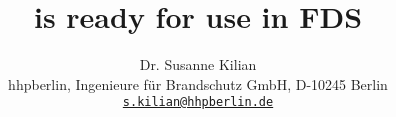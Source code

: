 \documentclass[12pt]{article}
\def\bibPath{../../../fds/Manuals/Bibliography}
\def\scarcPath{../ScaRC_Guide}
\begin{document}
\title{\scarc{} is ready for use in FDS}
\author{Dr. Susanne Kilian \\[2mm] hhpberlin, Ingenieure f\"ur Brandschutz GmbH, D-10245 Berlin \\ [1ex]\href{mailto:s.kilian@hhpberlin.de}{\tt s.kilian@hhpberlin.de}}
\date{} 
\begin{titlingpage}
  \maketitle
  
\end{titlingpage}









\end{document}
